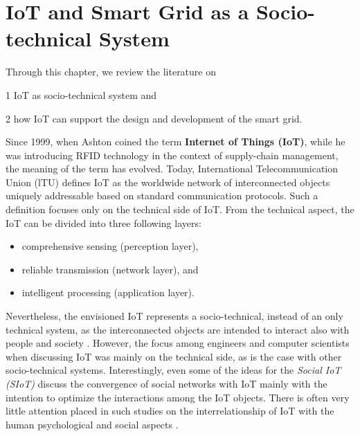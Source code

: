 \section{IoT and Smart Grid as a Socio-technical System}
\label{sec:IoT_socio-techical}

\begin{svgraybox}
	Through this chapter, we review the literature on
	
	1 IoT as socio-technical system and
	
	2 how IoT can support the design and development of the smart grid.
\end{svgraybox}

Since 1999, when Ashton \cite{ashton2011internet} coined the term \textbf{Internet of Things (IoT)}, while he was introducing RFID technology in the context of supply-chain management, the meaning of the term has evolved. Today, International Telecommunication Union (lTU) defines IoT as the worldwide network of interconnected objects uniquely addressable based on standard communication protocols. Such a definition focuses only on the technical side of IoT. From the technical aspect, the IoT can be divided into three following layers:
\begin{itemize}
	\item comprehensive sensing (perception layer),
	\item reliable transmission (network layer), and
	\item intelligent processing (application layer).
\end{itemize}
Nevertheless, the envisioned IoT represents a socio-technical, instead of an only technical system, as the interconnected objects are intended to interact also with people and society \cite{atzori2014smart,Shin2014}. 
However, the focus among engineers and computer scientists when discussing IoT was mainly on the technical side, as is the case with other socio-technical systems.
Interestingly, even some of the ideas for the \textit{Social IoT (SIoT)} \cite{atzori2012social,guinard2010sharing,atzori2014smart} discuss the convergence of social networks with IoT mainly with the intention to optimize the interactions among the IoT objects. There is often very little attention placed in such studies on the interrelationship of IoT with the human psychological and social aspects \cite{atzori2012social,guinard2010sharing}. 

